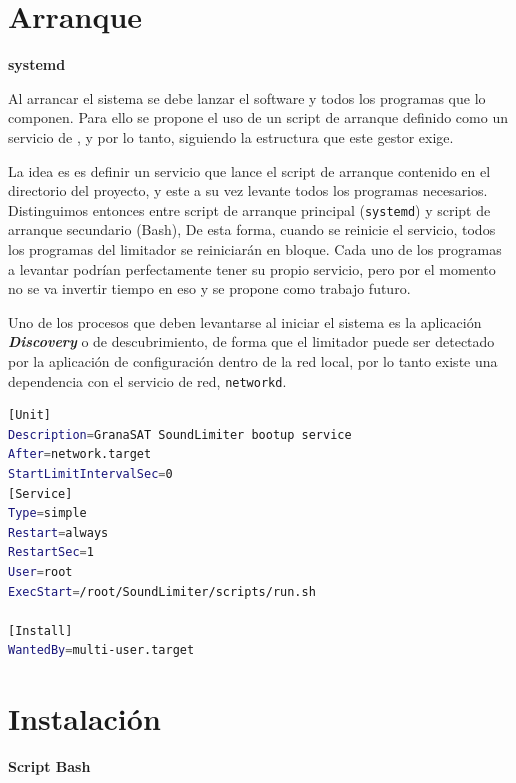 \clearpage


\section{Arranque}

\begin{flushright}
\textbf{systemd}
\end{flushright}

Al arrancar el sistema se debe lanzar el software y todos los programas que lo componen. Para ello se propone el uso de un script de arranque definido como un servicio de  \cite{systemd}, y por lo tanto, siguiendo la estructura que este gestor exige.

La idea es es definir un servicio que lance el script de arranque contenido en el directorio del proyecto, y este a su vez levante todos los programas necesarios. Distinguimos entonces entre script de arranque principal (\texttt{systemd}) y script de arranque secundario (Bash), De esta forma, cuando se reinicie el servicio, todos los programas del limitador se reiniciarán en bloque. Cada uno de los programas a levantar podrían perfectamente tener su propio servicio, pero por el momento no se va invertir tiempo en eso y se propone como trabajo futuro.

Uno de los procesos que deben levantarse al iniciar el sistema es la aplicación \textit{\textbf{Discovery}} o de descubrimiento, de forma que el limitador puede ser detectado por la aplicación de configuración dentro de la red local, por lo tanto existe una dependencia con el servicio de red, \texttt{networkd}.\\

\begin{lstlisting}[language=sh, caption={Ejemplo de servicio de arranque para el \acrshort{LM11}}, label={lst:lms11-boot}]
[Unit]
Description=GranaSAT SoundLimiter bootup service
After=network.target
StartLimitIntervalSec=0
[Service]
Type=simple
Restart=always
RestartSec=1
User=root
ExecStart=/root/SoundLimiter/scripts/run.sh

[Install]
WantedBy=multi-user.target
\end{lstlisting}

\section{Instalación}

\begin{flushright}
\textbf{Script Bash}
\end{flushright}

